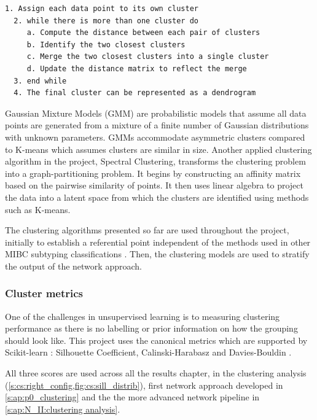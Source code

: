 \begin{lstlisting}[float=!h, caption={Agglomerative hierarchical clustering pseudocode}, label={code:agg_clustering}]
  1. Assign each data point to its own cluster
  2. while there is more than one cluster do
     a. Compute the distance between each pair of clusters
     b. Identify the two closest clusters
     c. Merge the two closest clusters into a single cluster
     d. Update the distance matrix to reflect the merge
  3. end while
  4. The final cluster can be represented as a dendrogram
\end{lstlisting}

Gaussian Mixture Models (GMM) are probabilistic models that assume all data points are generated from a mixture of a finite number of Gaussian distributions with unknown parameters. GMMs accommodate asymmetric clusters compared to K-means which assumes clusters are similar in size. Another applied clustering algorithm in the project, Spectral Clustering, transforms the clustering problem into a graph-partitioning problem. It begins by constructing an affinity matrix based on the pairwise similarity of points. It then uses linear algebra to project the data into a latent space from which the clusters are identified using methods such as K-means.

The clustering algorithms presented so far are used throughout the project, initially to establish a referential point independent of the methods used in other MIBC subtyping classifications \citep{Robertson2017-mg, Marzouka2018-ge, Kamoun2020-tj}. Then, the clustering models are used to stratify the output of the network approach.


\subsubsection*{Cluster metrics} \label{s:lit:clustering_metrics}

One of the challenges in unsupervised learning is to measuring clustering performance as there is no labelling or prior information on how the grouping should look like. This project uses the canonical metrics which are supported by Scikit-learn \citep{Pedregosa2011-ts,Scikit-learn_undated-ax}: Silhouette Coefficient, Calinski-Harabasz and Davies-Bouldin \citep{Rousseeuw1987-wy,Calinski1974-uu,Davies1979-tn}. 

All three scores are used across all the results chapter, in the clustering analysis (\cref{s:cs:right_config,fig:cs:sill_distrib}), first network approach developed in \cref{s:ap:p0_clustering} and the the more advanced network pipeline in \cref{s:ap:N_II:clustering analysis}.


